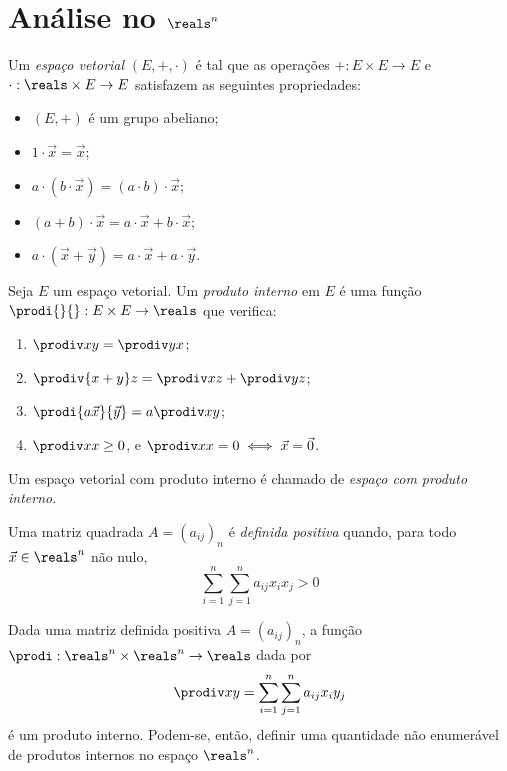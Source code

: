 \section{Análise no $\reals^n$}

\begin{definition}
	Um \emph{espaço vetorial} $(E,+,\cdot)$ é tal que as operações
	$+:E\times E \to E$ e $\cdot: \reals \times E \to E$ satisfazem 
	as seguintes propriedades:
	\begin{itemize}
		\item $(E,+)$ é um grupo abeliano;
		\item $1\cdot \vec x = \vec x$;
		\item $a\cdot (b\cdot \vec x) = (a\cdot b)\cdot \vec x$;
		\item $(a+b)\cdot \vec x = a\cdot \vec x + b\cdot \vec x$;
		\item $a\cdot (\vec x + \vec y) = a \cdot \vec x + a \cdot \vec y$.
	\end{itemize}
\end{definition}

\begin{definition}
	Seja $E$ um espaço vetorial. Um \emph{produto interno} em $E$ é uma função $\prodi{}{}:E\times E \to \reals$
	que verifica:
	\begin{enumerate}
		\item $\prodiv xy = \prodiv yx$;
		\item $\prodiv{x+y}z = \prodiv xz + \prodiv yz$;
		\item $\prodi{a \vec x}{\vec y} = a\prodiv xy$;
		\item $\prodiv xx \ge 0$, e $\prodiv xx = 0 \iff \vec x = \vec 0$.
	\end{enumerate}
	Um espaço vetorial com produto interno é chamado de \emph{espaço com produto interno}.
\end{definition}

\begin{definition}
	Uma matriz quadrada $A = (a_{ij})_n$ é \emph{definida positiva} quando, para todo $\vec x \in \reals^n$ não nulo,
	\[\sum\limits_{i=1}^n \sum\limits_{j=1}^n a_{ij}x_ix_j > 0\]
\end{definition}

\begin{fact}
	Dada uma matriz definida positiva $A = (a_{ij})_n$, a função $\prodi : \reals^n \times \reals^n \to \reals$
	dada por
	\[\prodiv xy = \sum\limits_{i=1}^n \sum\limits_{j=1}^n a_{ij}x_iy_j \]
	é um produto interno. Podem-se, então, definir uma quantidade não enumerável de produtos internos no espaço 
	$\reals^n$.
\end{fact}

